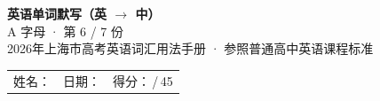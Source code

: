 \documentclass[10pt,a4paper]{article}
\begin{document}
\pagestyle{plain}

\begin{center}
{\LARGE\bfseries 英语单词默写（英 $\to$ 中）}\\[0.22em]
{\large A 字母 · 第 6 / 7 份}\\[0.18em]
{\small 2026年上海市高考英语词汇用法手册 · 参照普通高中英语课程标准}
\end{center}

\vspace{0.25em}
\noindent\begin{tabular}{@{}p{}@{}p{}@{}p{}@{}}
姓名：\underline{\hspace{2.0cm}} & 日期：\underline{\hspace{2.0cm}} & 得分：\underline{\hspace{1.3cm}}\,/\,45 \\
\end{tabular}

\vspace{0.3em}

\vspace{0.08em}
\end{document}
